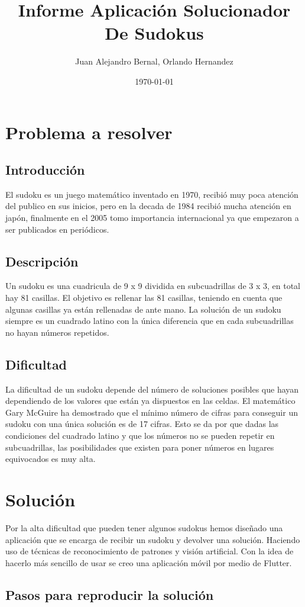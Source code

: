\documentclass{article}
\author{Juan Alejandro Bernal, Orlando Hernandez}
\title{\textbf{Informe Aplicaci\'on Solucionador De Sudokus}}
\date{\today}
\begin{document}
\maketitle
\section{Problema a resolver}
\subsection{Introducci\'on}
El sudoku es un juego matem\'atico inventado en 1970,  
recibi\'o muy poca atenci\'on del publico en sus inicios, pero en 
la decada de 1984 recibi\'o mucha atenci\'on en jap\'on, finalmente
en el 2005 tomo importancia internacional ya que empezaron
a ser publicados en peri\'odicos.
\subsection{Descripci\'on}
Un sudoku es una cuadricula de 9 x 9  dividida en subcuadrillas
de 3 x 3, en total hay 81 casillas. El objetivo es rellenar las
81 casillas, teniendo en cuenta que algunas casillas ya est\'an rellenadas
de ante mano. La soluci\'on de un sudoku siempre es un cuadrado latino con la \'unica 
diferencia que en cada subcuadrillas no hayan números repetidos.
\subsection{Dificultad}
La dificultad de un sudoku depende del n\'umero de soluciones posibles que hayan 
dependiendo de los valores que est\'an ya dispuestos en las celdas. El matem\'atico Gary
McGuire ha demostrado que el m\'inimo n\'umero de cifras para conseguir un sudoku con una \'unica soluci\'on es de 17 cifras.
Esto se da por que dadas las condiciones del cuadrado latino y que los n\'umeros no se pueden
repetir en subcuadrillas, las posibilidades que existen para poner n\'umeros en lugares equivocados
es muy alta. 
\section{Soluci\'on}
Por la alta dificultad que pueden tener algunos sudokus hemos dise\~nado una aplicaci\'on que se
encarga de recibir un sudoku y devolver una solución.
Haciendo uso de técnicas de reconocimiento de patrones y visión artificial. 
Con la idea de hacerlo m\'as sencillo de usar se creo una aplicaci\'on m\'ovil por medio de Flutter. 
\subsection{Pasos para reproducir la soluci\'on}
\end{document}
